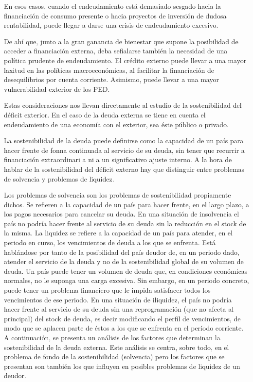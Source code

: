 \documentclass[10pt,a4paper]{article}
\begin{document}
En esos casos, cuando el endeudamiento está demasiado sesgado hacia la financiación de consumo presente o hacia proyectos de inversión de dudosa rentabilidad, puede llegar a darse una crisis de endeudamiento excesivo.

De ahí que, junto a la gran ganancia de bienestar que supone la posibilidad de acceder a financiación externa, deba sefialarse también la necesidad de una política prudente de endeudamiento. El crédito externo puede llevar a una mayor laxitud en las políticas macroeconómicas, al facilitar la financiación de desequilibrios por cuenta corriente. Asimismo, puede llevar a una mayor vulnerabilidad exterior de los PED.

Estas consideraciones nos llevan directamente al estudio de la sostenibilidad del déficit exterior. En el caso de la deuda externa se tiene en cuenta el endeudamiento de una economía con el exterior, sea éste público o privado. 

La sostenibilidad de la deuda puede definirse como la capacidad de un país para hacer frente de fonna continuada al servicio de su deuda, sin tener que recurrir a financiación extraordinari a ni a un significativo ajuste interno. A la hora de hablar de la sostenibilidad del déficit externo hay que distinguir entre problemas de solvencia y problemas de liquidez.

Los problemas de solvencia son los problemas de sostenibilidad propiamente dichos. Se refieren a la capacidad de un país para hacer frente, en el largo plazo, a los pagos necesarios para cancelar su deuda. En una situación de insolvencia el país no podría hacer frente al servicio de su deuda sin la reducción en el stock de la misma. La liquidez se refiere a la capacidad de un país para atender, en el periodo en curso, los vencimientos de deuda a los que se enfrenta. Está hablándose por tanto de la posibilidad del país deudor de, en un periodo dado, atender el servicio de la deuda y no de la sostenibilidad global de su volumen de deuda. Un país puede tener un volumen de deuda que, en condiciones económicas normales, no le suponga una carga excesiva. Sin embargo, en un periodo concreto, puede tener un problema financiero que le impida satisfacer todos los vencimientos de ese periodo. En una situación de iliquidez, el país no podría hacer frente al servicio de su deuda sin una reprogramación (que no afecta al principal) del stock de deuda, es decir modificando el perfil de vencimientos, de modo que se aplacen parte de éstos a los que se enfrenta en el período corriente. A continuación, se presenta un análisis de los factores que determinan la sostenibilidad de la deuda externa. Este análisis se centra, sobre todo, en el problema de fondo de la sostenibilidad (solvencia) pero los factores que se presentan son también los que influyen en posibles problemas de liquidez de un deudor.
\end{document}

